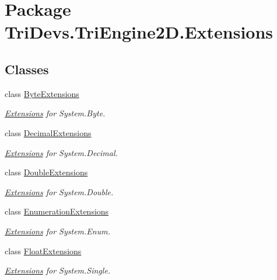 \hypertarget{namespace_tri_devs_1_1_tri_engine2_d_1_1_extensions}{\section{Package Tri\-Devs.\-Tri\-Engine2\-D.\-Extensions}
\label{namespace_tri_devs_1_1_tri_engine2_d_1_1_extensions}
}
\subsection*{Classes}
\begin{DoxyCompactItemize}
\item 
class \hyperlink{class_tri_devs_1_1_tri_engine2_d_1_1_extensions_1_1_byte_extensions}{Byte\-Extensions}
\begin{DoxyCompactList}\small\item\em \hyperlink{namespace_tri_devs_1_1_tri_engine2_d_1_1_extensions}{Extensions} for System.\-Byte. \end{DoxyCompactList}\item 
class \hyperlink{class_tri_devs_1_1_tri_engine2_d_1_1_extensions_1_1_decimal_extensions}{Decimal\-Extensions}
\begin{DoxyCompactList}\small\item\em \hyperlink{namespace_tri_devs_1_1_tri_engine2_d_1_1_extensions}{Extensions} for System.\-Decimal. \end{DoxyCompactList}\item 
class \hyperlink{class_tri_devs_1_1_tri_engine2_d_1_1_extensions_1_1_double_extensions}{Double\-Extensions}
\begin{DoxyCompactList}\small\item\em \hyperlink{namespace_tri_devs_1_1_tri_engine2_d_1_1_extensions}{Extensions} for System.\-Double. \end{DoxyCompactList}\item 
class \hyperlink{class_tri_devs_1_1_tri_engine2_d_1_1_extensions_1_1_enumeration_extensions}{Enumeration\-Extensions}
\begin{DoxyCompactList}\small\item\em \hyperlink{namespace_tri_devs_1_1_tri_engine2_d_1_1_extensions}{Extensions} for System.\-Enum. \end{DoxyCompactList}\item 
class \hyperlink{class_tri_devs_1_1_tri_engine2_d_1_1_extensions_1_1_float_extensions}{Float\-Extensions}
\begin{DoxyCompactList}\small\item\em \hyperlink{namespace_tri_devs_1_1_tri_engine2_d_1_1_extensions}{Extensions} for System.\-Single. \end{DoxyCompactList}\item 

\end{DoxyCompactItemize}
